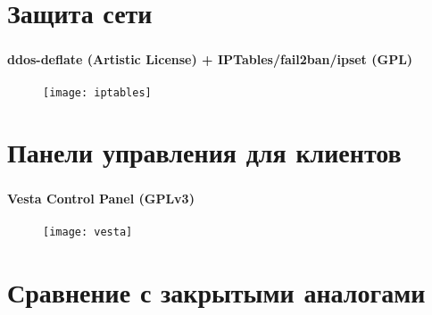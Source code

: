 
\section{Защита сети}

\begin{frame}
\frametitle{\insertsection}
\framesubtitle{ddos-deflate (Artistic License) + IPTables/fail2ban/ipset (GPL)}
\begin{figure}[h]
	\center
	\texttt{[image: iptables]}
\end{figure}
\end{frame}


\section{Панели управления для клиентов}

\begin{frame}
\frametitle{\insertsection}
\framesubtitle{Vesta Control Panel (GPLv3)}
\begin{figure}[h]
	\center
	\texttt{[image: vesta]}
\end{figure}
\end{frame}


\section{Сравнение с закрытыми аналогами}

